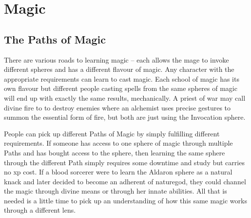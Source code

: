 \chapter{Magic}
\label{magic_paths}

\section{The Paths of Magic}

\begin{multicols}{2}

There are various roads to learning magic -- each allows the mage to invoke different spheres and has a different flavour of magic.
Any character with the appropriate requirements can learn to cast magic.
Each school of magic has its own flavour but different people casting spells from the same spheres of magic will end up with exactly the same results, mechanically.
A priest of war may call divine fire to to destroy enemies where an alchemist uses precise gestures to summon the essential form of fire, but both are just using the Invocation sphere.

People can pick up different Paths of Magic by simply fulfilling different requirements.
If someone has access to one sphere of magic through multiple Paths and has bought access to the sphere, then learning the same sphere through the different Path simply requires some \gls{downtime} and study but carries no \gls{xp} cost.
If a blood sorcerer were to learn the Aldaron sphere as a natural knack and later decided to become an adherent of \gls{naturegod}, they could channel the magic through divine means or through her innate abilities.
All that is needed is a little time to pick up an understanding of how this same magic works through a different lens.

\end{multicols}

